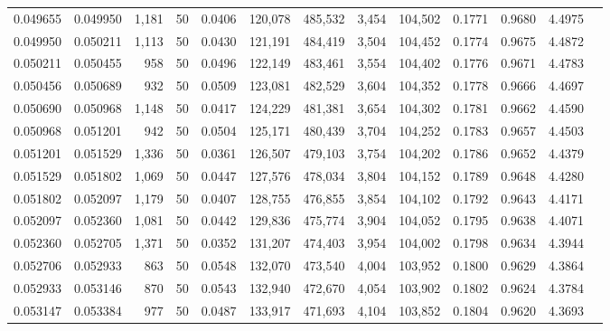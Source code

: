 \begin{tabular}{rrrrrrrrrrrrr}
0.049655 & 0.049950 & 1,181 &  50 &                                     0.0406 & 120,078 & 485,532 &   3,454 & 104,502 & 0.1771 & 0.9680 & 4.4975 \\
0.049950 & 0.050211 & 1,113 &  50 &                                     0.0430 & 121,191 & 484,419 &   3,504 & 104,452 & 0.1774 & 0.9675 & 4.4872 \\
0.050211 & 0.050455 &   958 &  50 &                                     0.0496 & 122,149 & 483,461 &   3,554 & 104,402 & 0.1776 & 0.9671 & 4.4783 \\
0.050456 & 0.050689 &   932 &  50 &                                     0.0509 & 123,081 & 482,529 &   3,604 & 104,352 & 0.1778 & 0.9666 & 4.4697 \\
0.050690 & 0.050968 & 1,148 &  50 &                                     0.0417 & 124,229 & 481,381 &   3,654 & 104,302 & 0.1781 & 0.9662 & 4.4590 \\
0.050968 & 0.051201 &   942 &  50 &                                     0.0504 & 125,171 & 480,439 &   3,704 & 104,252 & 0.1783 & 0.9657 & 4.4503 \\
0.051201 & 0.051529 & 1,336 &  50 &                                     0.0361 & 126,507 & 479,103 &   3,754 & 104,202 & 0.1786 & 0.9652 & 4.4379 \\
0.051529 & 0.051802 & 1,069 &  50 &                                     0.0447 & 127,576 & 478,034 &   3,804 & 104,152 & 0.1789 & 0.9648 & 4.4280 \\
0.051802 & 0.052097 & 1,179 &  50 &                                     0.0407 & 128,755 & 476,855 &   3,854 & 104,102 & 0.1792 & 0.9643 & 4.4171 \\
0.052097 & 0.052360 & 1,081 &  50 &                                     0.0442 & 129,836 & 475,774 &   3,904 & 104,052 & 0.1795 & 0.9638 & 4.4071 \\
0.052360 & 0.052705 & 1,371 &  50 &                                     0.0352 & 131,207 & 474,403 &   3,954 & 104,002 & 0.1798 & 0.9634 & 4.3944 \\
0.052706 & 0.052933 &   863 &  50 &                                     0.0548 & 132,070 & 473,540 &   4,004 & 103,952 & 0.1800 & 0.9629 & 4.3864 \\
0.052933 & 0.053146 &   870 &  50 &                                     0.0543 & 132,940 & 472,670 &   4,054 & 103,902 & 0.1802 & 0.9624 & 4.3784 \\
0.053147 & 0.053384 &   977 &  50 &                                     0.0487 & 133,917 & 471,693 &   4,104 & 103,852 & 0.1804 & 0.9620 & 4.3693 \\

\end{tabular}
